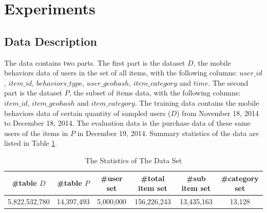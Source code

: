 \documentclass{llncs}
\begin{document}
\section{Experiments}
\subsection{Data Description}
The data contains two parts.
The first part is the dataset $D$, the mobile behaviors data of users in the set of all items,
with the following columns: $user\_id$, $item\_id$, $behaviors\_type$, $user\_geohash$,
$item\_category$ and $time$.
The second part is the dataset $P$, the subset of items data,
with the following columns: $item\_id$, $item\_geohash$ and $item\_category$.
The training data contains the mobile behaviors data of
certain quantity of sampled users ($D$) from November 18, 2014
to December 18, 2014.
The evaluation data is the purchase data of these same users of
the items in $P$ in December 19, 2014.
Summary statistics of the data are listed in Table \ref{tab:sta}.
\begin{table}[htbp]
	\normalsize
	\centering
	\caption{The Statistics of The Data Set}
	\begin{tabular}{|c|c|c|c|c|c|}
		\hline
		\#table $D$ & \#table $P$ & \#user set & \#total item set & \#sub item set & \#category set \\
		\hline
		5,822,532,780 & 14,397,493 & 5,000,000 & 156,226,243 & 13,435,163 & 13,128 \\
		\hline
	\end{tabular}
	\label{tab:sta}
\end{table}
\end{document}
